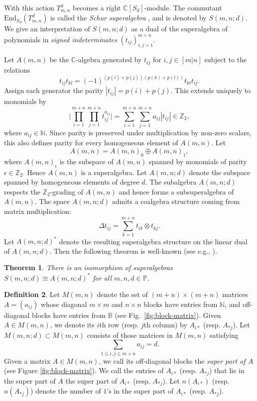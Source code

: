 \documentclass[12pt,reqno]{amsart}
\newtheorem{theorem}{Theorem}[section]
\theoremstyle{definition}
\newtheorem{definition}[theorem]{Definition}
\theoremstyle{remark}
\newcommand{\T}{T_{m,n}^{d}}
\newcommand{\aj}{A_{*j}}
\newcommand{\ai}{A_{i*}}
\begin{document}
With this action $\T$ becomes a right $\mathbb{C}[S_{d}]$-module. The commutant $\text{End}_{S_{d}}(\T)$ is called the \textit{Schur superalgebra} \cite[Section 3.1]{hemmer2004representation}, and is denoted by $S(m,n;d)$. We give an interpretation of $S(m,n;d)$ as a dual of the superalgebra of polynomials in \textit{signed indeterminates} $(t_{ij})_{i,j=1}^{m+n}$.


Let $A(m,n)$ be the $\mathbb{C}$-algebra generated by $t_{ij}$ for $i,j\in [m|n]$ subject to the relations $$t_{ij}t_{kl}=(-1)^{(p(i)+p(j))(p(k)+p(l))}t_{kl}t_{ij}.$$ Assign each generator the parity $|t_{ij}|=p(i)+p(j)$. This extends uniquely to monomials by
$$\bigg|\prod_{i=1}^{m+n}\prod_{j=1}^{m+n}t_{ij}^{a_{ij}}\bigg|=\sum_{i=1}^{m+n}\sum_{j=1}^{m+n} a_{ij}|t_{ij}|\in\mathbb{Z}_2,$$
where $a_{ij}\in\mathbb N$. Since parity is preserved under multiplication by non-zero scalars, this also defines parity for every homogeneous element of $A(m,n)$. Let 
$$A(m,n)=A(m,n)_0 \oplus A(m,n)_1,$$
where $A(m,n)_{\epsilon}$ is the subspace of $A(m,n)$ spanned by monomials of parity $\epsilon\in\mathbb Z_2$. Hence $A(m,n)$ is a superalgebra. Let $A(m,n;d)$ denote the subspace spanned by homogeneous elements of degree $d$. The subalgebra $A(m,n;d)$ respects the $\mathbb{Z}_2$-grading of $A(m,n)$ and hence forms a subsuperalgebra of $A(m,n)$.
The space $A(m,n;d)$ admits a coalgebra structure coming from matrix multiplication:
\begin{displaymath}
    \Delta t_{ij} = \sum_{k=1}^{m+n} t_{ik}\otimes t_{kj}.
\end{displaymath}
Let $A(m,n;d)^{*}$ denote the resulting superalgebra structure on the linear dual of $A(m,n;d)$.
Then the following theorem is well-known (see e.g., \cite[Section 5]{brundan2003new}).
\begin{theorem} \label{isomorphismSchur}
    There is an isomorphism of superalgebras $S(m,n;d)\cong A(m,n;d)^{*}$ for all $m,n,d\in \mathbb P$.
\end{theorem}
\begin{definition}
    Let $M(m,n)$ denote the set of $(m+n)\times (m+n)$ matrices $A=(a_{ij})$ whose diagonal $m\times m$ and $n\times n$ blocks have entries from $\mathbb N$, and off-diagonal blocks have entries from $\mathbb B$ (see Fig.~\ref{fig:block-matrix}). Given $A\in M(m,n)$, we denote its $i$th row (resp. $j$th column) by $\ai$ (resp. $\aj$). Let $M(m,n;d)\subset M(m,n)$ consists of those matrices in $M(m,n)$ satisfying $$\sum_{1\leq i,j\leq m+n}a_{ij}=d.$$
    Given a matrix $A\in M(m,n)$, we call its off-diagonal blocks the \textit{super part of $A$} (see Figure \ref{fig:block-matrix}). We call the entries of $\ai$ (resp. $\aj$) that lie in the super part of $A$ the super part of $\ai$ (resp. $\aj$). Let $n(\ai)$ (resp. $n(\aj)$) denote the number of $1$'s in the super part of $\ai$ (resp. $\aj$).
\end{definition}
\end{document}
